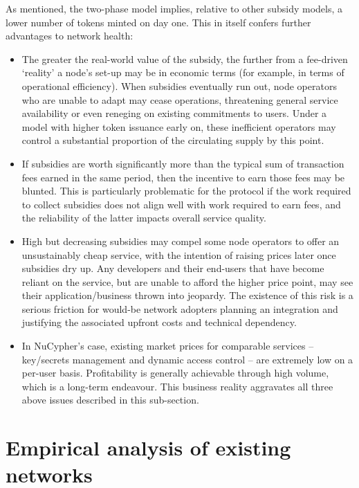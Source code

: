 \documentclass[8pt]{article}
\begin{document}
As mentioned, the two-phase model implies, relative to other subsidy models, a lower number of tokens minted on day one. This in itself confers further advantages to network health:  
\begin{itemize}
\item The greater the real-world value of the subsidy, the further from a fee-driven `reality' a node's set-up may be in economic terms (for example, in terms of operational efficiency). When subsidies eventually run out, node operators who are unable to adapt may cease operations, threatening general service availability or even reneging on existing commitments to users. Under a model with higher token issuance early on, these inefficient operators may control a substantial proportion of the circulating supply by this point. 
\item If subsidies are worth significantly more than the typical sum of transaction fees earned in the same period, then the incentive to earn those fees may be blunted. This is particularly problematic for the protocol if the work required to collect subsidies does not align well with work required to earn fees, and the reliability of the latter impacts overall service quality. 
\item High but decreasing subsidies may compel some node operators to offer an unsustainably cheap service, with the intention of raising prices later once subsidies dry up. Any developers and their end-users that have become reliant on the service, but are unable to afford the higher price point, may see their application/business thrown into jeopardy. The existence of this risk is a serious friction for would-be network adopters planning an integration and justifying the associated upfront costs and technical dependency.
\item In NuCypher's case, existing market prices for comparable services – key/secrets management and dynamic access control – are extremely low on a per-user basis. Profitability is generally achievable through high volume, which is a long-term endeavour. This business reality aggravates all three above issues described in this sub-section.
\end{itemize}

\section{Empirical analysis of existing networks}
\end{document}
